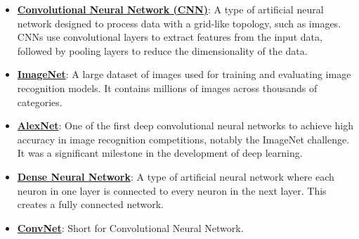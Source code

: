 \documentclass{article}%
\begin{document}
\begin{itemize}[leftmargin=*]%
\item \href{https://purdue.brightspace.com/d2l/common/assets/pdfjs-d2l-dist/1.0.14-legacy/web/viewer.html?file=\%2Fcontent\%2Fenforced\%2F1095467-wl.202510.CS.24300.001\%2F09L1-cnn.pdf\%3Fou\%3D1095467\&lang=en-us\&container=d2l-fileviewer-rendered-pdf\&fullscreen=d2l-fileviewer-rendered-pdf-dialog\&height=667#page=2}{\textbf{Convolutional Neural Network (CNN)}}: A type of artificial neural network designed to process data with a grid-like topology, such as images. CNNs use convolutional layers to extract features from the input data, followed by pooling layers to reduce the dimensionality of the data.%
\item \href{https://purdue.brightspace.com/d2l/common/assets/pdfjs-d2l-dist/1.0.14-legacy/web/viewer.html?file=\%2Fcontent\%2Fenforced\%2F1095467-wl.202510.CS.24300.001\%2F09L1-cnn.pdf\%3Fou\%3D1095467\&lang=en-us\&container=d2l-fileviewer-rendered-pdf\&fullscreen=d2l-fileviewer-rendered-pdf-dialog\&height=667#page=3}{\textbf{ImageNet}}: A large dataset of images used for training and evaluating image recognition models. It contains millions of images across thousands of categories.%
\item \href{https://purdue.brightspace.com/d2l/common/assets/pdfjs-d2l-dist/1.0.14-legacy/web/viewer.html?file=\%2Fcontent\%2Fenforced\%2F1095467-wl.202510.CS.24300.001\%2F09L1-cnn.pdf\%3Fou\%3D1095467\&lang=en-us\&container=d2l-fileviewer-rendered-pdf\&fullscreen=d2l-fileviewer-rendered-pdf-dialog\&height=667#page=3}{\textbf{AlexNet}}: One of the first deep convolutional neural networks to achieve high accuracy in image recognition competitions, notably the ImageNet challenge. It was a significant milestone in the development of deep learning.%
\item \href{https://purdue.brightspace.com/d2l/common/assets/pdfjs-d2l-dist/1.0.14-legacy/web/viewer.html?file=\%2Fcontent\%2Fenforced\%2F1095467-wl.202510.CS.24300.001\%2F09L1-cnn.pdf\%3Fou\%3D1095467\&lang=en-us\&container=d2l-fileviewer-rendered-pdf\&fullscreen=d2l-fileviewer-rendered-pdf-dialog\&height=667#page=4}{\textbf{Dense Neural Network}}: A type of artificial neural network where each neuron in one layer is connected to every neuron in the next layer. This creates a fully connected network.%
\item \href{https://purdue.brightspace.com/d2l/common/assets/pdfjs-d2l-dist/1.0.14-legacy/web/viewer.html?file=\%2Fcontent\%2Fenforced\%2F1095467-wl.202510.CS.24300.001\%2F09L1-cnn.pdf\%3Fou\%3D1095467\&lang=en-us\&container=d2l-fileviewer-rendered-pdf\&fullscreen=d2l-fileviewer-rendered-pdf-dialog\&height=667#page=4}{\textbf{ConvNet}}: Short for Convolutional Neural Network.%

\end{itemize}
\end{document}
